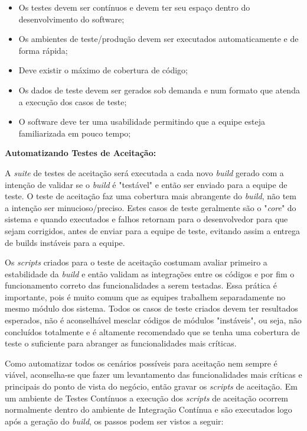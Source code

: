 \begin{itemize}
	\item Os testes devem ser contínuos e devem ter seu espaço dentro do desenvolvimento do software;
	\item Os ambientes de teste/produção devem ser executados automaticamente e de forma rápida;
	\item Deve existir o máximo de cobertura de código;
	\item Os dados de teste devem ser gerados sob demanda e num formato que atenda a execução dos casos de teste;
	\item O software deve ter uma usabilidade permitindo que a equipe esteja familiarizada em pouco tempo;
\end{itemize}

\textbf{Automatizando Testes de Aceitação:}

A \textit{suite} de testes de aceitação será executada a cada novo \textit{build} gerado com a intenção de validar se o \textit{build} é "testável" e então ser enviado para a equipe de teste. O teste de aceitação faz uma cobertura mais abrangente do \textit{build}, não tem a intenção ser minucioso/preciso. Estes casos de teste geralmente são o "\textit{core}" do sistema e quando executados e falhos retornam para o desenvolvedor para que sejam corrigidos, antes de enviar para a equipe de teste, evitando assim a entrega de builds instáveis para a equipe.

Os \textit{scripts} criados para o teste de aceitação costumam avaliar primeiro a estabilidade da \textit{build} e então validam as integrações entre os códigos e por fim o funcionamento correto das funcionalidades a serem testadas. Essa prática é importante, pois é muito comum que as equipes trabalhem separadamente no mesmo módulo dos sistema. Todos os casos de teste criados devem ter resultados esperados, não é aconselhável mesclar códigos de módulos "instáveis", ou seja, não concluídos totalmente e é altamente recomendado que se tenha uma cobertura de teste o suficiente para abranger as funcionalidades mais críticas.

Como automatizar todos os cenários possíveis para aceitação nem sempre é viável, aconselha-se que fazer um levantamento das funcionalidades mais críticas e principais do ponto de vista do negócio, então gravar os \textit{scripts} de aceitação. Em um ambiente de Testes Contínuos a execução dos \textit{scripts} de aceitação ocorrem normalmente dentro do ambiente de Integração Contínua e são executados logo após a geração do \textit{build}, os passos podem ser vistos a seguir:

